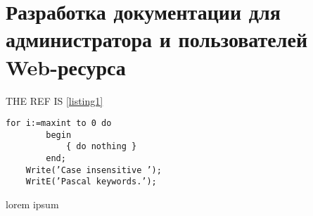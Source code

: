 \section{Разработка документации для администратора и пользователей Web-ресурса}

THE REF IS \ref{listing1}



\begin{lstlisting}[caption=example, xleftmargin=1.2cm]
    for i:=maxint to 0 do
        begin
            { do nothing }
        end;
    Write(’Case insensitive ’);
    WritE(’Pascal keywords.’);
    \end{lstlisting}
lorem ipsum

\clearpage
